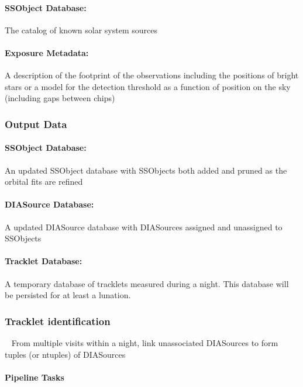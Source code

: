 \paragraph*{SSObject Database: } The catalog of known solar system sources

\paragraph*{Exposure Metadata:} A description of the footprint of the observations including the positions of bright stars or a model for the detection threshold as a function of position on the sky (including gaps between chips)


\subsubsection{Output Data}

\paragraph*{SSObject Database: } An updated SSObject database with SSObjects both added and pruned as the orbital fits are refined

\paragraph*{DIASource Database:} A updated DIASource database with DIASources assigned and unassigned to SSObjects 

\paragraph*{Tracklet Database:} A temporary database of tracklets measured during a night. This database will be persisted for at least a lunation.

\subsubsection{Tracklet identification}~
From multiple visits within a night, link unassociated DIASources to form tuples (or ntuples) of DIASources

\paragraph{Pipeline Tasks}

